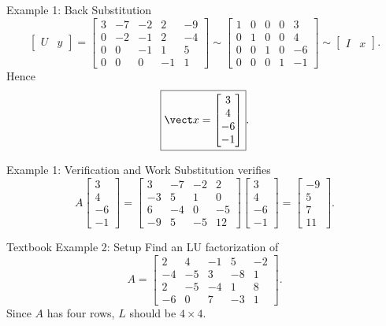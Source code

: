 \begin{frame}{Example 1: Back Substitution}
\small
\[
\begin{bmatrix}U&y\end{bmatrix}= \left[\begin{array}{rrrr|r}
3&-7&-2&2&-9\\
0&-2&-1&2&-4\\
0&0&-1&1&5\\
0&0&0&-1&1
\end{array}\right]
\sim
\left[\begin{array}{rrrr|r}
1&0&0&0&3\\
0&1&0&0&4\\
0&0&1&0&-6\\
0&0&0&1&-1
\end{array}\right]\sim
\begin{bmatrix}I&x\end{bmatrix}.
\]
\pause
Hence
\[
\boxed{\vect x=\begin{bmatrix}3\\4\\-6\\-1\end{bmatrix}}.
\]
\end{frame}

\begin{frame}{Example 1: Verification and Work}
Substitution verifies
\[
A\begin{bmatrix}3\\4\\-6\\-1\end{bmatrix}
=\begin{bmatrix}
3&-7&-2&2\\
-3&5&1&0\\
6&-4&0&-5\\
-9&5&-5&12
\end{bmatrix}\begin{bmatrix}3\\4\\-6\\-1\end{bmatrix}
=\begin{bmatrix}-9\\5\\7\\11\end{bmatrix}.
\]
\end{frame}

\begin{frame}{Textbook Example 2: Setup}
Find an LU factorization of
\[
A=\begin{bmatrix}
2&4&-1&5&-2\\
-4&-5&3&-8&1\\
2&-5&-4&1&8\\
-6&0&7&-3&1
\end{bmatrix}.
\]
Since $A$ has four rows, $L$ should be $4\times4$.
\end{frame}

